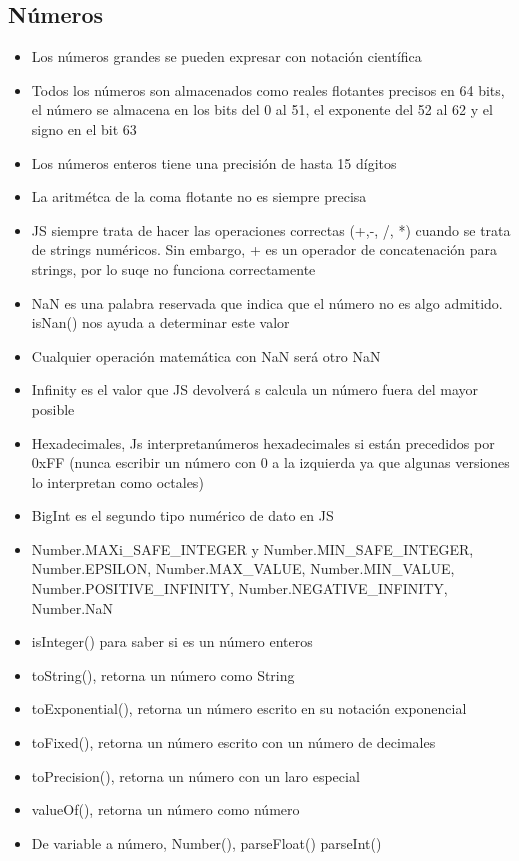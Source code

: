 \documentclass{article}
\begin{document}
 \subsection{Números}
 \begin{itemize}
   \item Los números grandes se pueden expresar con notación científica
   \item Todos los números son almacenados como reales flotantes precisos en 64 bits, el número se almacena en los bits del 0 al 51, el exponente del 52 al 62 y el signo en el bit 63
   \item Los números enteros tiene una precisión de hasta 15 dígitos
   \item La aritmétca de la coma flotante no es siempre precisa
   \item JS siempre trata de hacer las operaciones correctas (+,-, /, *) cuando se trata de strings numéricos. Sin embargo, + es un operador de concatenación para strings, por lo suqe no funciona correctamente
   \item NaN es una palabra reservada que indica que el número no es algo admitido. isNan() nos ayuda a determinar este valor
   \item Cualquier operación matemática con NaN será otro NaN
   \item Infinity es el valor que JS devolverá s calcula un número fuera del mayor posible
   \item Hexadecimales, Js interpretanúmeros hexadecimales si están precedidos por 0xFF (nunca escribir un número con 0 a la izquierda ya que algunas versiones lo interpretan como octales)
   \item BigInt es el segundo tipo numérico de dato en JS
   \item Number.MAXi\_SAFE\_INTEGER y Number.MIN\_SAFE\_INTEGER, Number.EPSILON, Number.MAX\_VALUE, Number.MIN\_VALUE, Number.POSITIVE\_INFINITY, Number.NEGATIVE\_INFINITY, Number.NaN 
   \item isInteger() para saber si es un número enteros
   \item toString(), retorna un número como String
   \item toExponential(), retorna un número escrito en su notación exponencial
   \item toFixed(), retorna un número escrito con un número de decimales
   \item toPrecision(), retorna un número con un laro especial
     \item valueOf(), retorna un número como número
     \item De variable a número, Number(), parseFloat() parseInt()
 \end{itemize}
\end{document}
